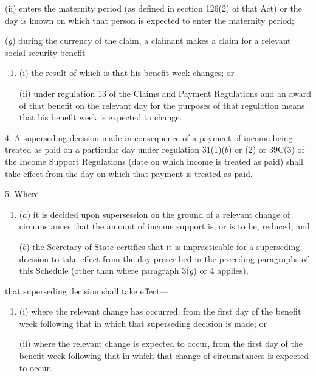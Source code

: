 \documentclass[12pt,a4paper]{article}
\begin{document}
\begin{enumerate}
\begin{enumerate}
(ii) enters the maternity period (as defined in section 126(2) of that Act) or the day is known on which that person is expected to enter the maternity period;
\end{enumerate}

($g$) during the currency of the claim, a claimant makes a claim for a relevant social security benefit—
\begin{enumerate}\item[]
(i) the result of which is that his benefit week changes; or

(ii) under regulation 13 of the Claims and Payment Regulations and an award of that benefit on the relevant day for the purposes of that regulation means that his benefit week is expected to change.
\end{enumerate}
\end{enumerate}

\medskip

4.  A superseding decision made in consequence of a payment of income being treated as paid on a particular day under regulation 31(1)($b$)  or (2) or 39C(3) of the Income Support Regulations (date on which income is treated as paid) shall take effect from the day on which that payment is treated as paid.

\medskip

5.  Where—
\begin{enumerate}\item[]
($a$) it is decided upon supersession on the ground of a relevant change of circumstances that the amount of income support is, or is to be, reduced; and

($b$) the Secretary of State certifies that it is impracticable for a superseding decision to take effect from the day prescribed in the preceding paragraphs of this Schedule (other than where paragraph 3($g$)  or 4 applies),
\end{enumerate}
that superseding decision shall take effect—
\begin{enumerate}\item[]
(i) where the relevant change has occurred, from the first day of the benefit week following that in which that superseding decision is made; or

(ii) where the relevant change is expected to occur, from the first day of the benefit week following that in which that change of circumstances is expected to occur.
\end{enumerate}

\medskip
\end{document}
